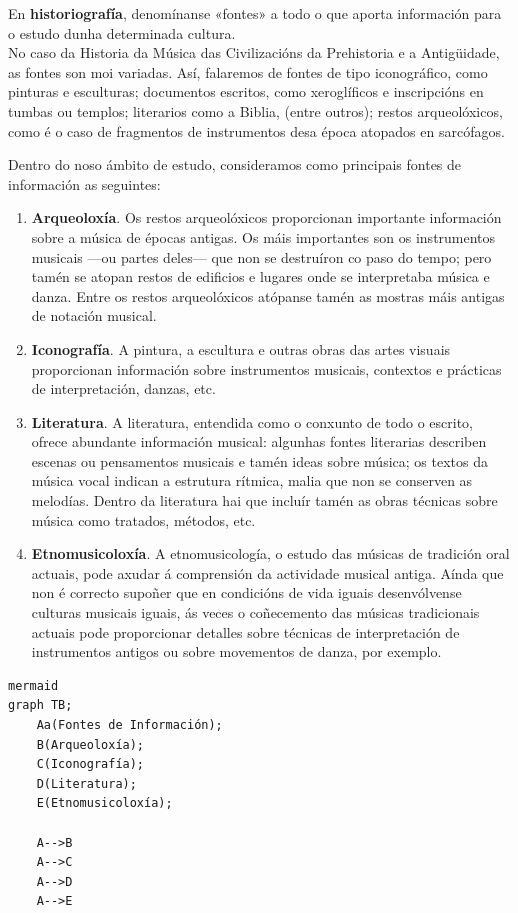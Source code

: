 \documentclass[a4paper, twoside]{templates/ociamthesis}
\providecommand{\tightlist}{%
  \setlength{\itemsep}{0pt}\setlength{\parskip}{0pt}}
\theoremstyle{definition}
\theoremstyle{definition}
\theoremstyle{definition}
\theoremstyle{definition}
\theoremstyle{remark}
\begin{document}
En \textbf{historiografía}, denomínanse «fontes» a todo o que aporta información para o estudo dunha determinada cultura.\\
No caso da Historia da Música das Civilizacións da Prehistoria e a Antigüidade, as fontes son moi variadas. Así, falaremos de fontes de tipo iconográfico, como pinturas e esculturas; documentos escritos, como xeroglíficos e inscripcións en tumbas ou templos; literarios como a Biblia, (entre outros); restos arqueolóxicos, como é o caso de fragmentos de instrumentos desa época atopados en sarcófagos.

Dentro do noso ámbito de estudo, consideramos como principais fontes de información as seguintes:

\begin{enumerate}
\def\labelenumi{\arabic{enumi}.}
\tightlist
\item
  \textbf{Arqueoloxía}. Os restos arqueolóxicos proporcionan importante información sobre a música de épocas antigas. Os máis importantes son os instrumentos musicais ---ou partes deles--- que non se destruíron co paso do tempo; pero tamén se atopan restos de edificios e lugares onde se interpretaba música e danza. Entre os restos arqueolóxicos atópanse tamén as mostras máis antigas de notación musical.
\item
  \textbf{Iconografía}. A pintura, a escultura e outras obras das artes visuais proporcionan información sobre instrumentos musicais, contextos e prácticas de interpretación, danzas, etc.
\item
  \textbf{Literatura}. A literatura, entendida como o conxunto de todo o escrito, ofrece abundante información musical: algunhas fontes literarias describen escenas ou pensamentos musicais e tamén ideas sobre música; os textos da música vocal indican a estrutura rítmica, malia que non se conserven as melodías. Dentro da literatura hai que incluír tamén as obras técnicas sobre música como tratados, métodos, etc.
\item
  \textbf{Etnomusicoloxía}. A etnomusicología, o estudo das músicas de tradición oral actuais, pode axudar á comprensión da actividade musical antiga. Aínda que non é correcto supoñer que en condicións de vida iguais desenvólvense culturas musicais iguais, ás veces o coñecemento das músicas tradicionais actuais pode proporcionar detalles sobre técnicas de interpretación de instrumentos antigos ou sobre movementos de danza, por exemplo.
\end{enumerate}

\begin{verbatim}
mermaid
graph TB;
    Aa(Fontes de Información);
    B(Arqueoloxía);
    C(Iconografía);
    D(Literatura);
    E(Etnomusicoloxía);
    
    A-->B
    A-->C
    A-->D
    A-->E
\end{verbatim}
\end{document}
